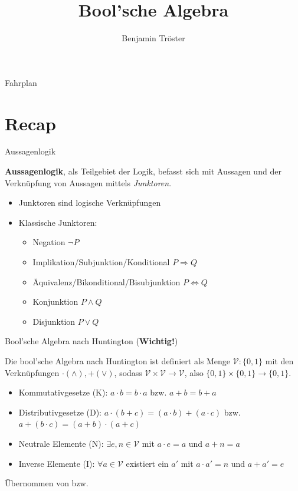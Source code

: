 \documentclass[12pt%
,aspectratio=169%
]{beamer}
\author{Benjamin Tröster}
\title[Bool'sche Algebra]{Bool'sche Algebra}
\institute[HTW Berlin]{Hochschule für Technik und Wirtschaft Berlin}
\begin{document}
\begin{frame}
\titlepage
\end{frame}

\begin{frame}{Fahrplan}
\tableofcontents[hideothersubsections]
\end{frame}

\section{Recap}
\begin{frame}{Aussagenlogik}
\begin{definition}[Aussagenlogik]
\textbf{Aussagenlogik}, als Teilgebiet der Logik, befasst sich mit Aussagen und der Verknüpfung von Aussagen mittels \textit{Junktoren}.
\end{definition}
\begin{itemize}
	\item Junktoren sind logische Verknüpfungen
	\item Klassische Junktoren:
	\begin{itemize}
		\item Negation $\neg P$ 
		\item Implikation/Subjunktion/Konditional $P\Rightarrow Q$
		\item Äquivalenz/Bikonditional/Bisubjunktion $P\Leftrightarrow Q$
		\item Konjunktion $P\land Q$
		\item Disjunktion $P\lor Q$
	\end{itemize}
\end{itemize}
\cite{rautenberg2002einfuhrung}
\end{frame}

\begin{frame}{Bool'sche Algebra nach Huntington (\textbf{Wichtig!})}
\begin{definition}
Die bool'sche Algebra nach Huntington ist definiert als Menge $\mathcal{V}: \{0,1\}$ mit den Verknüpfungen $\cdot (\land), + (\lor)$, sodass $\mathcal{V} \times \mathcal{V} \to \mathcal{V}$, also $\{0,1\} \times \{0,1\} \to \{0,1\}$. 
\end{definition}
\begin{itemize}
	\item Kommutativgesetze (K): $a \cdot b = b \cdot a$ bzw. $a + b = b + a$
	\item Distributivgesetze (D): $a \cdot (b + c) = (a \cdot b) + (a \cdot c)$ bzw. $a + (b \cdot c) = (a + b) \cdot (a + c)$
	\item Neutrale Elemente (N): $ \exists e, n \in \mathcal{V}$ mit  $a \cdot e = a$ und $a + n = a$
	\item Inverse Elemente (I): $\forall a \in \mathcal{V}$ existiert ein $a'$ mit $a \cdot a'= n$ und $a + a' = e$
\end{itemize}
Übernommen von \cite{barnett2013boolean} bzw. \cite{hoffmann2020grundlagen}
\end{frame}
\end{document}
